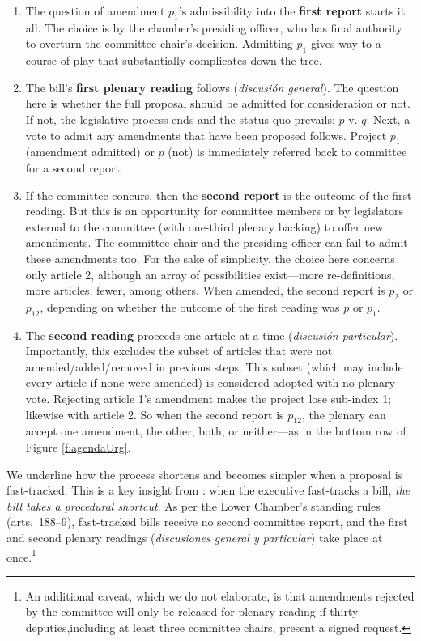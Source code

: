\documentclass[letter,12pt]{article}
\begin{document}
\begin{enumerate}
\item The question of amendment $p_1$'s admissibility into the \textbf{first report} starts it all. The choice is by the chamber's presiding officer, who has final authority to overturn the committee chair's decision. Admitting $p_1$ gives way to a course of play that substantially complicates down the tree. 
\item The bill's \textbf{first plenary reading} follows (\emph{discusión general}). The question here is whether the full proposal should be admitted for consideration or not. If not, the legislative process ends and the status quo prevails: $p$ v. $q$. Next, a vote to admit any amendments that have been proposed follows. Project $p_1$ (amendment admitted) or $p$ (not) is immediately referred back to committee for a second report. 
\item If the committee concurs, then the \textbf{second report} is the outcome of the first reading. But this is an opportunity for committee members or by legislators external to the committee (with one-third plenary backing) to offer new amendments. The committee chair and the presiding officer can fail to admit these amendments too. For the sake of simplicity, the choice here concerns only article 2, although an array of possibilities exist---more re-definitions, more articles, fewer, among others. When amended, the second report is $p_2$ or $p_{12}$, depending on whether the outcome of the first reading was $p$ or $p_1$. 
\item The \textbf{second reading} proceeds one article at a time (\emph{discusión particular}). Importantly, this excludes the subset of articles that were not amended/added/removed in previous steps. This subset (which may include every article if none were amended) is considered adopted with no plenary vote. Rejecting article 1's amendment makes the project lose sub-index 1; likewise with article 2. So when the second report is $p_{12}$, the plenary can accept one amendment, the other, both, or neither---as in the bottom row of Figure \ref{f:agendaUrg}. 
\end{enumerate}

We underline how the process shortens and becomes simpler when a proposal is fast-tracked. This is a key insight from \citet{sotoCongChile2015}: when the executive fast-tracks a bill, \emph{the bill takes a procedural shortcut}. As per the Lower Chamber's standing rules (arts.~188--9), fast-tracked bills receive no second committee report, and the first and second plenary readings (\emph{discusiones general y particular}) take place at once.\footnote{An additional caveat, which we do not elaborate, is that amendments rejected by the committee will only be released for plenary reading if thirty deputies,including at least three committee chairs, present a signed request.} 
\end{document}
